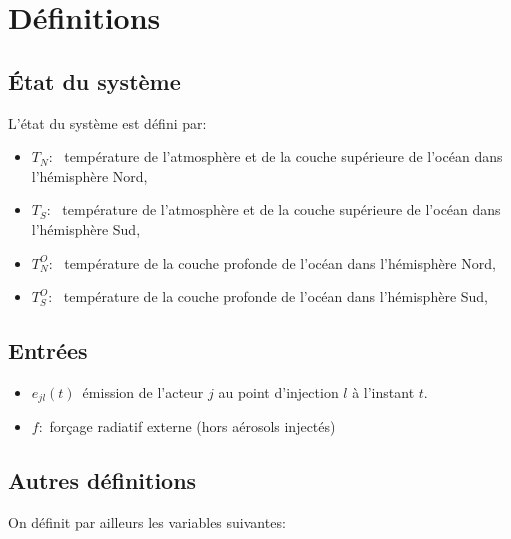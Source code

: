 \documentclass[a4paper,12pt]{article}
\begin{document}
\renewcommand{\labelitemi}{\textbullet} 
\newcommand{\tn}{\ensuremath{T_N}}
\newcommand{\ts}{\ensuremath{T_S}}
\newcommand{\tno}{\ensuremath{T_N^O}}
\newcommand{\tso}{\ensuremath{T_S^O}}

\newcommand{\gn}{\ensuremath{g_N}}
\newcommand{\xt}{\ensuremath{x^T}}
\newcommand{\gs}{\ensuremath{g_S}}
\newcommand{\cn}{\ensuremath{C_N}}
\newcommand{\cs}{\ensuremath{C_S}}
\newcommand{\cno}{\ensuremath{C_N^O}}
\newcommand{\cso}{\ensuremath{C_S^O}}
\newcommand{\tauns}{\ensuremath{\tau_{NS}}}
\newcommand{\taunso}{\ensuremath{\tau_{NS}^O}}
\newcommand{\nlat}{\ensuremath{n_{\text{lat}}}}
\section{Définitions}

\subsection{\'{E}tat du système}
L'état du système est défini par:
\begin{itemize}
  \item \tn:  \  température de l'atmosphère et de la couche supérieure de l'océan dans l'hémisphère Nord,
  \item \ts:  \  température de l'atmosphère et de la couche supérieure de l'océan dans l'hémisphère Sud, 
  \item \tno: \  température de la couche profonde de l'océan dans l'hémisphère Nord,                     
  \item \tso: \  température de la couche profonde de l'océan dans l'hémisphère Sud,                      
\end{itemize}


\subsection{Entrées}

\begin{itemize}
  \item $e_{jl}(t)$\ émission de l'acteur $j$ au point d'injection $l$ à l'instant $t$.
  \item $f$:\ forçage radiatif externe (hors aérosols injectés)
\end{itemize}

\subsection{Autres définitions}
On définit par ailleurs les variables suivantes:
\end{document}
